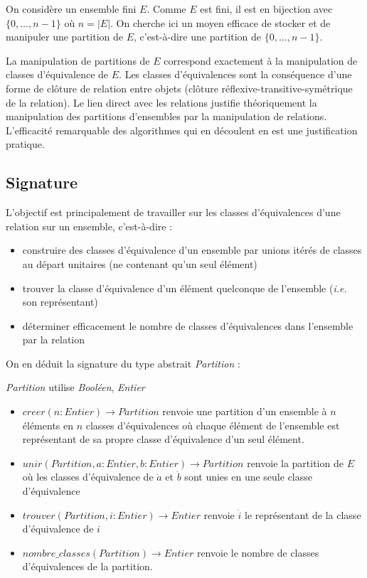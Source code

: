 \documentclass[../../../main.tex]{subfiles}
\begin{document}
On considère un ensemble fini $E$. Comme $E$ est fini, il est en bijection avec $\{0, \dots, n - 1\}$ où $n = |E|$. On cherche ici un moyen efficace de stocker et de manipuler une partition de $E$, c'est-à-dire une partition de $\{0, \dots, n-1\}$.

La manipulation de partitions de $E$ correspond exactement à la manipulation de classes d'équivalence de $E$. Les classes d'équivalences sont la conséquence d'une forme de clôture de relation entre objets (clôture réflexive-transitive-symétrique de la relation). Le lien direct avec les relations justifie théoriquement la manipulation des partitions d'ensembles par la manipulation de relations. L'efficacité remarquable des algorithmes qui en découlent en est une justification pratique.
\subsection{Signature}
\label{sub:partition_principe_et_signature}
L'objectif est principalement de travailler sur les classes d'équivalences d'une relation sur un ensemble, c'est-à-dire :
\begin{itemize}
	\item construire des classes d'équivalence d'un ensemble par unions itérés de classes au départ unitaires (ne contenant qu'un seul élément)
	\item trouver la classe d'équivalence d'un élément quelconque de l'ensemble (\textit{i.e.} son représentant)
	\item déterminer efficacement le nombre de classes d'équivalences dans l'ensemble par la relation
\end{itemize}
On en déduit la signature du type abstrait \textit{Partition} :

\textit{Partition} utilise \textit{Booléen}, \textit{Entier}
\begin{itemize}
	\item $creer(n:Entier)\rightarrow Partition$ renvoie une partition d'un ensemble à $n$ éléments en $n$ classes d'équivalences où chaque élément de l'ensemble est représentant de sa propre classe d'équivalence d'un seul élément.
	\item $unir(Partition, a:Entier, b:Entier)\rightarrow Partition$ renvoie la partition de $E$ où les classes d'équivalence de $\dot{a}$ et $\dot{b}$ sont unies en une seule classe d'équivalence
	\item $trouver(Partition, i:Entier)\rightarrow Entier$ renvoie $\dot{i}$ le représentant de la classe d'équivalence de $i$
	\item $nombre\_classes(Partition)\rightarrow Entier$ renvoie le nombre de classes d'équivalences de la partition.
\end{itemize}
\end{document}
